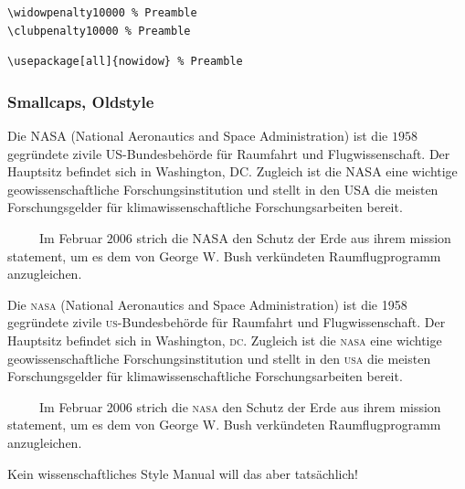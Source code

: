 \documentclass[aspectratio=169, 10pt]{beamer}
\begin{document}
\begin{frame}[fragile]
\begin{figure}
\begin{subfigure}{.35\textwidth}
        \end{subfigure}%
    \end{figure}
    \pause

    \begin{lstlisting}
\widowpenalty10000 % Preamble
\clubpenalty10000 % Preamble
    \end{lstlisting}

    \begin{lstlisting}
\usepackage[all]{nowidow} % Preamble
    \end{lstlisting}
\end{frame}

\begin{frame}[fragile]
    \frametitle{Smallcaps, Oldstyle}%
    \vspace*{-2.5ex}
    \begin{multicols}{2}
        \small\justifying
        Die NASA (National Aeronautics and Space Administration) ist die $1958$ gegründete zivile US-Bundesbehörde für Raumfahrt und Flugwissenschaft.
        Der Hauptsitz befindet sich in Washington, DC.
        Zugleich ist die NASA eine wichtige geowissenschaftliche Forschungsinstitution und stellt in den USA die meisten Forschungsgelder für klimawissenschaftliche Forschungsarbeiten bereit.

        ~~~~~Im Februar $2006$ strich die NASA den Schutz der Erde aus ihrem mission statement, um es dem von George W. Bush verkündeten Raumflugprogramm anzugleichen.

        Die \textsc{nasa} (National Aeronautics and Space Administration) ist die 1958 gegründete zivile \textsc{us}-Bundesbehörde für Raumfahrt und Flugwissenschaft.
        Der Hauptsitz befindet sich in Washington, \textsc{dc}.
        Zugleich ist die \textsc{nasa} eine wichtige geowissenschaftliche Forschungsinstitution und stellt in den \textsc{usa} die meisten Forschungsgelder für klimawissenschaftliche Forschungsarbeiten bereit.

        ~~~~~Im Februar 2006 strich die \textsc{nasa} den Schutz der Erde aus ihrem mission statement, um es dem von George W. Bush verkündeten Raumflugprogramm anzugleichen.
    \end{multicols}
    \pause
    Kein wissenschaftliches Style Manual will das aber tatsächlich!
\end{frame}

\end{document}
